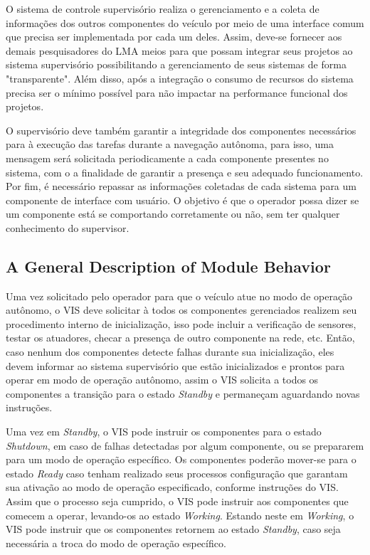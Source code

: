 \documentclass[conference]{IEEEtran}
\begin{document}
O sistema de controle supervisório realiza o gerenciamento e a coleta de informações dos outros componentes do veículo por meio de uma interface comum que precisa ser implementada por cada um deles. Assim, deve-se fornecer aos demais pesquisadores do LMA meios para que possam integrar seus projetos ao sistema supervisório possibilitando a gerenciamento de seus sistemas de forma "transparente". Além disso, após a integração o consumo de recursos do sistema precisa ser o mínimo possível para não impactar na performance funcional dos projetos. 

O supervisório deve também garantir a integridade dos componentes necessários para à execução das tarefas durante a navegação autônoma, para isso, uma mensagem será solicitada periodicamente a cada componente presentes no sistema, com o a finalidade de garantir a presença e seu adequado funcionamento. Por fim, é necessário repassar as informações coletadas de cada sistema para um componente de interface com usuário. O objetivo é que o operador possa dizer se um componente está se comportando corretamente ou não, sem ter qualquer conhecimento do supervisor.

%
\subsection{A General Description of Module Behavior}\label{subsec:module_behavior}

Uma vez solicitado pelo operador para que o veículo atue no modo de operação autônomo, o VIS deve solicitar à todos os componentes gerenciados realizem seu procedimento interno de inicialização, isso pode incluir a verificação de sensores, testar os atuadores, checar a presença de outro componente na rede, etc.
Então, caso nenhum dos componentes detecte falhas durante sua inicialização, eles devem informar ao sistema supervisório que estão inicializados e prontos para operar em modo de operação autônomo, assim o VIS solicita a todos os componentes a transição para o estado \textit{Standby} e permaneçam aguardando novas instruções. 

Uma vez em \textit{Standby}, o VIS pode instruir os componentes para o estado \textit{Shutdown}, em caso de falhas detectadas por algum componente, ou se prepararem para um modo de operação específico. Os componentes poderão mover-se para o estado \textit{Ready} caso tenham realizado seus processos configuração que garantam sua ativação ao modo de operação especificado, conforme instruções do VIS.  Assim que o processo seja cumprido, o VIS pode instruir aos componentes que comecem a operar, levando-os ao estado \textit{Working}. Estando neste em \textit{Working}, o VIS pode instruir que os componentes retornem ao estado \textit{Standby}, caso seja necessária a troca do modo de operação específico.
\end{document}
